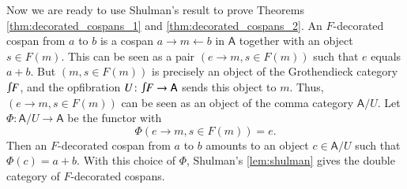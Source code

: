 \documentclass[reqno]{amsart}
\let\maps\colon
\theoremstyle{definition}
\theoremstyle{remark}
\newcommand{\A}{\mathsf{A}}
\newcommand{\inta}{\raisebox{.3\depth}{$\smallint\hspace{-.01in}$}}
\begin{document}
Now we are ready to use Shulman's result to prove Theorems \ref{thm:decorated_cospans_1} and  \ref{thm:decorated_cospans_2}.  An $F$-decorated cospan from $a$ to $b$ 
is a cospan $a \to m \leftarrow b$ in $\A$ together with an object $s \in F(m)$.   This can be seen as a pair $(e \to m, s \in F(m))$ such that $e$ equals $a + b$.   But $(m,s \in F(m))$ is precisely an object of the Grothendieck category $\inta F$, and the opfibration $U \maps \inta F \to \A$ sends this object to $m$.  Thus, $(e \to m, s \in F(m))$ can be seen as an object of the comma category $\A/U$.   Let $\Phi \maps \A/U \to \A$ be the functor with
\[    \Phi(e \to m,s \in F(m)) = e .\]
Then an $F$-decorated cospan from $a$ to $b$ amounts to an object $c \in \A/U$ such that $\Phi(c) = a + b$.    With this choice of $\Phi$, Shulman's \ref{lem:shulman} gives the double category of $F$-decorated cospans.
\end{document}
